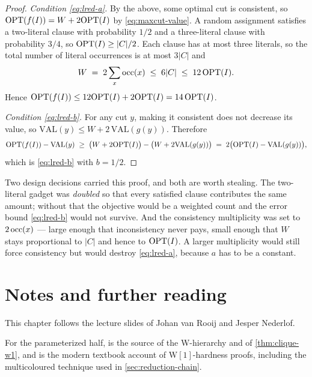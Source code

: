 \begin{proof}
\emph{Condition \eqref{eq:lred-a}.} By the above, some optimal cut is
consistent, so $\mathrm{OPT}(f(I)) = W + 2\mathrm{OPT}(I)$ by \eqref{eq:maxcut-value}. A random
assignment satisfies a two-literal clause with probability $1/2$ and a
three-literal clause with probability $3/4$, so $\mathrm{OPT}(I) \ge |C|/2$. Each clause
has at most three literals, so the total number of literal occurrences is at
most $3|C|$ and
\[ W \;=\; 2\sum_{x} \operatorname{occ}(x) \;\le\; 6|C| \;\le\; 12\,\mathrm{OPT}(I). \]
Hence $\mathrm{OPT}(f(I)) \le 12\mathrm{OPT}(I) + 2\mathrm{OPT}(I) = 14\,\mathrm{OPT}(I)$.

\emph{Condition \eqref{eq:lred-b}.} For any cut $y$, making it consistent does
not decrease its value, so $\mathrm{VAL}(y) \le W + 2\,\mathrm{VAL}(g(y))$.
Therefore
\[ \mathrm{OPT}(f(I)) - \mathrm{VAL}(y)
   \;\ge\; \bigl(W + 2\mathrm{OPT}(I)\bigr) - \bigl(W + 2\mathrm{VAL}(g(y))\bigr)
   \;=\; 2\bigl(\mathrm{OPT}(I) - \mathrm{VAL}(g(y))\bigr), \]
which is \eqref{eq:lred-b} with $b = 1/2$.
\end{proof}

\begin{intuition}
Two design decisions carried this proof, and both are worth stealing. The
two-literal gadget was \emph{doubled} so that every satisfied clause contributes
the same amount; without that the objective would be a weighted count and the
error bound \eqref{eq:lred-b} would not survive. And the consistency
multiplicity was set to $2\operatorname{occ}(x)$ --- large enough that inconsistency never
pays, small enough that $W$ stays proportional to $|C|$ and hence to $\mathrm{OPT}(I)$.
A larger multiplicity would still force consistency but would destroy
\eqref{eq:lred-a}, because $a$ has to be a constant.
\end{intuition}

\section{Notes and further reading}
\label{sec:hardness-further-reading}

This chapter follows the lecture slides of Johan van Rooij and Jesper Nederlof.

For the parameterized half, \citet{DowneyFellows2013} is the source of the
W-hierarchy and of \cref{thm:clique-w1}, and
\citet[Chapter~13]{CyganEtAl2015} is the modern textbook account of
$\mathrm{W}[1]$-hardness proofs, including the multicoloured technique used in
\cref{sec:reduction-chain}.

